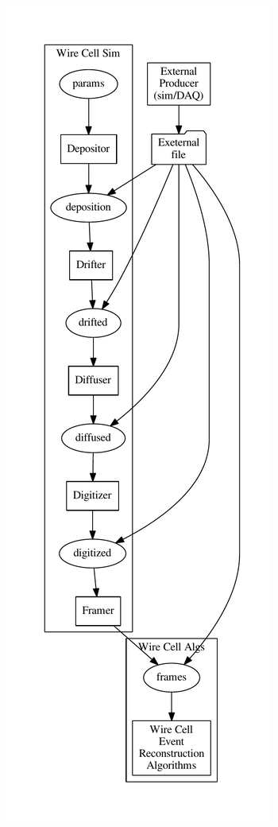 \begin{frame}
\begin{columns}
\begin{column}{0.25\textwidth}
      \includegraphics[width=\textwidth]{sim-flow.pdf}
    \end{column}
  \end{columns}
\end{frame}

